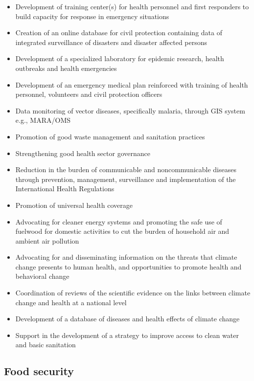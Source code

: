\documentclass[
]{book}
\providecommand{\tightlist}{%
  \setlength{\itemsep}{0pt}\setlength{\parskip}{0pt}}
\begin{document}
\begin{itemize}
\tightlist
\item
  Development of training center(s) for health personnel and first responders to build capacity for response in emergency situations
\item
  Creation of an online database for civil protection containing data of integrated surveillance of disasters and disaster affected persons
\item
  Development of a specialized laboratory for epidemic research, health outbreaks and health emergencies
\item
  Development of an emergency medical plan reinforced with training of health personnel, volunteers and civil protection officers
\item
  Data monitoring of vector diseases, specifically malaria, through GIS system e.g., MARA/OMS
\item
  Promotion of good waste management and sanitation practices\\
\item
  Strengthening good health sector governance
\item
  Reduction in the burden of communicable and noncommunicable diseases through prevention, management, surveillance and implementation of the International Health Regulations
\item
  Promotion of universal health coverage
\item
  Advocating for cleaner energy systems and promoting the safe use of fuelwood for domestic activities to cut the burden of household air and ambient air pollution
\item
  Advocating for and disseminating information on the threats that climate change presents to human health, and opportunities to promote health and behavioral change
\item
  Coordination of reviews of the scientific evidence on the links between climate change and health at a national level
\item
  Development of a database of diseases and health effects of climate change
\item
  Support in the development of a strategy to improve access to clean water and basic sanitation
\end{itemize}

\hypertarget{food-security-1}{%
\subsection{Food security}\label{food-security-1}}
\end{document}
